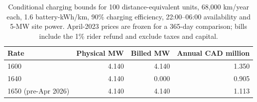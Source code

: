 \begin{table}[htbp]
\centering
\begin{tabular}{@{}lrrr@{}}
\toprule
Rate & Physical MW & Billed MW & Annual CAD million\\
\midrule
1600 & 4.140 & 4.140 & 1.350\\
1640 & 4.140 & 0.000 & 0.905\\
1650 (pre-Apr 2026) & 4.140 & 4.140 & 1.113\\
\bottomrule
\end{tabular}
\caption{Conditional charging bounds for 100 distance-equivalent units, 68,000 km/year each, 1.6 battery-kWh/km, 90\% charging efficiency, 22:00--06:00 availability and 5-MW site power. April-2023 prices are frozen for a 365-day comparison; bills include the 1\% rider refund and exclude taxes and capital.}
\end{table}
